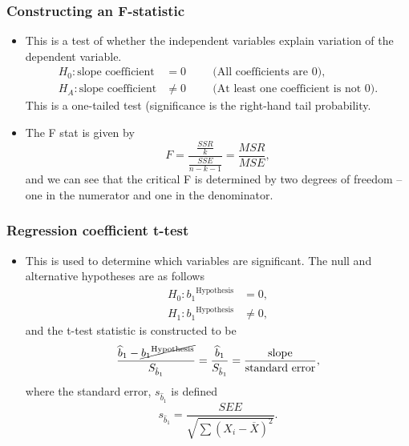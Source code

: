 \documentclass[../notes_compiled.tex]{subfiles}
\begin{document}
\subsubsection{Constructing an F-statistic}
\begin{itemize}
\item This is a test of whether the independent variables explain variation of the dependent variable. 
\begin{align*}
H_{0}: \text{slope coefficient}&=0 \hspace{1cm}\text{(All coefficients are 0)}, \\
H_{A}: \text{slope coefficient}&\neq0 \hspace{1cm}\text{(At least one coefficient is not 0)}.
\end{align*}
This is a one-tailed test (significance is the right-hand tail probability.
\item The F stat is given by 
\begin{equation}
F=\frac{\frac{SSR}{k}}{\frac{SSE}{n-k-1}}=\frac{MSR}{MSE},
\end{equation}
and we can see that the critical F is determined by two degrees of freedom -- one in the numerator and one in the denominator.
\end{itemize}
\subsubsection{Regression coefficient t-test}
\begin{itemize}
\item This is used to determine which variables are significant. The null and alternative hypotheses are as follows
\begin{align*}
H_{0}: {b_{1}}^{\text{Hypothesis}} &= 0, \\
H_{1}: {b_{1}}^{\text{Hypothesis}} &\neq 0,
\end{align*}
and the t-test statistic is constructed to be 
\begin{equation}
\frac{\widehat{b}_{1} - \cancel{{b_{1}}^{\text{Hypothesis}}}}{S_{\hat{b}_{1}}} = \frac{\widehat{b}_{1}}{S_{\hat{b}_{1}}} = \frac{\text{slope}}{\text{standard error}},
\end{equation}
where the standard error, $s_{\widehat{b}_{1}}$ is defined
\begin{equation}
s_{\hat{b}_{1}} = \frac{SEE}{\sqrt{\sum(X_{i}-\overline{X})^{2}}}.
\end{equation}
\end{itemize}
\end{document}
